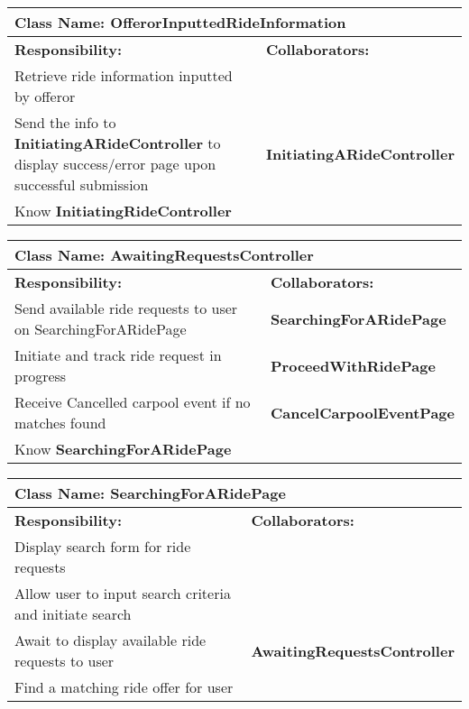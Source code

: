 \documentclass[]{article}
\begin{document}
\begin{table}[H]
    \centering
    \begin{tabular}{|p{5cm}|p{5cm}|}
        \hline
        \multicolumn{2}{|l|}{\textbf{Class Name:} OfferorInputtedRideInformation} \\
        \hline
        \textbf{Responsibility:} & \textbf{Collaborators:} \\
        \hline
        Retrieve ride information inputted by offeror & \phantom{} \\
        \hline
        Send the info to \textbf{InitiatingARideController} to display success/error page upon successful submission & \textbf{InitiatingARideController} \\
        \hline
        Know \textbf{InitiatingRideController}  & \phantom{} \\
    \hline
        \end{tabular}
    \end{table}

\begin{table}[H]
    \centering
    \begin{tabular}{|p{5cm}|p{5cm}|}
        \hline 
        \multicolumn{2}{|l|}{\textbf{Class Name:} AwaitingRequestsController} \\
        \hline
        \textbf{Responsibility:} & \textbf{Collaborators:} \\
        \hline
        Send available ride requests to user on SearchingForARidePage & \textbf{SearchingForARidePage} \\
        \hline
        Initiate and track ride request in progress & \textbf{ProceedWithRidePage} \\
        \hline
        Receive Cancelled carpool event if no matches found & \textbf{CancelCarpoolEventPage} \\
        \hline
        Know \textbf{SearchingForARidePage}  & \phantom{} \\
    \hline
        
    \end{tabular}
\end{table}

\begin{table}[H]
    \centering
    \begin{tabular}{|p{5cm}|p{5cm}|}
        \hline 
        \multicolumn{2}{|l|}{\textbf{Class Name:} SearchingForARidePage} \\
        \hline
        \textbf{Responsibility:} & \textbf{Collaborators:} \\
        \hline
        Display search form for ride requests &  \phantom{} \\
        \hline
        Allow user to input search criteria and initiate search & \phantom{} \\
        \hline
        Await to display available ride requests to user & \textbf{AwaitingRequestsController} \\
        \hline
         Find a matching ride offer for user & \textbf{} \\
        \hline
    \end{tabular}
\end{table}
\end{document}
